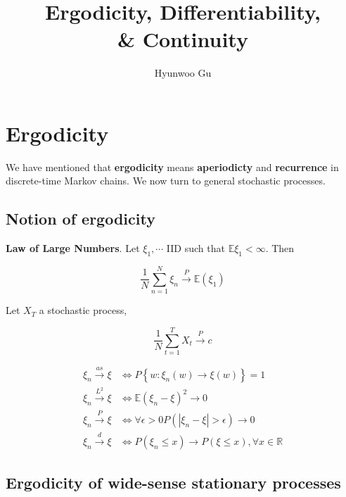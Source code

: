 \documentclass[12pt]{article}
\theoremstyle{nonumberbreak}
\begin{document}
\title{\textbf{Ergodicity, Differentiability, \\ \& Continuity}}
\author{Hyunwoo Gu}
\date{}

\maketitle


\section{Ergodicity}

We have mentioned that \textbf{ergodicity} means \textbf{aperiodicty} and \textbf{recurrence} in discrete-time Markov chains. We now turn to general stochastic processes.

\subsection{Notion of ergodicity}

\begin{theorem}
\textbf{Law of Large Numbers}. Let $\xi_1, \cdots $ IID such that $\mathbb{E} \xi_1 < \infty$. Then

$$
\frac{1}{N} \sum_{n=1}^N \xi_n \overset{P}{\to} \mathbb{E}(\xi_1)
$$

\end{theorem}

Let $X_T$ a stochastic process,

$$
\frac{1}{N} \sum_{t=1}^T X_t \overset{P}{\to} c
$$


$$
\begin{aligned}
\xi_n \overset{as}{\to} \xi &\Leftrightarrow P \left\{ w: \xi_n(w)  \to \xi(w) \right\} = 1 \\[8pt]
\xi_n \overset{L^2}{\to} \xi &\Leftrightarrow \mathbb{E}(\xi_n - \xi)^2 \to 0 \\[8pt]
\xi_n \overset{P}{\to} \xi &\Leftrightarrow \forall \epsilon >0 P(|\xi_n - \xi| > \epsilon) \to 0 \\[8pt]
\xi_n \overset{d}{\to} \xi &\Leftrightarrow P(\xi_n \le x) \to P(\xi \le x), \forall x \in \mathbb{R}
\end{aligned}
$$



\subsection{Ergodicity of wide-sense stationary processes}
\end{document}
